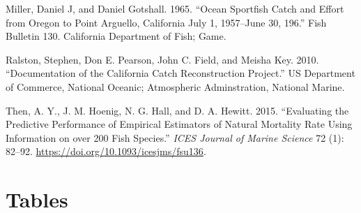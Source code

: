 \documentclass[11pt,
  english,
  a4paper,
]{article}
\begin{document}
\begin{cslreferences}
\leavevmode\hypertarget{ref-miller_ocean_1965}{}%
Miller, Daniel J, and Daniel Gotshall. 1965. ``Ocean Sportfish Catch and Effort from Oregon to Point Arguello, California July 1, 1957--June 30, 196.'' Fish Bulletin 130. California Department of Fish; Game.

\leavevmode\hypertarget{ref-ralston_documentation_2010}{}%
Ralston, Stephen, Don E. Pearson, John C. Field, and Meisha Key. 2010. ``Documentation of the California Catch Reconstruction Project.'' US Department of Commerce, National Oceanic; Atmospheric Adminstration, National Marine.

\leavevmode\hypertarget{ref-then_evaluating_2015-1}{}%
Then, A. Y., J. M. Hoenig, N. G. Hall, and D. A. Hewitt. 2015. ``Evaluating the Predictive Performance of Empirical Estimators of Natural Mortality Rate Using Information on over 200 Fish Species.'' \emph{ICES Journal of Marine Science} 72 (1): 82--92. \url{https://doi.org/10.1093/icesjms/fsu136}.
\end{cslreferences}

\leavevmode\tagmcend\tagstructend

\clearpage


\hypertarget{tables}{%
\section{Tables}\label{tables}}

\leavevmode\tagmcend\tagstructend



\newpage

\begingroup\fontsize{10}{12}\selectfont
\begingroup\fontsize{10}{12}\selectfont
\end{document}

